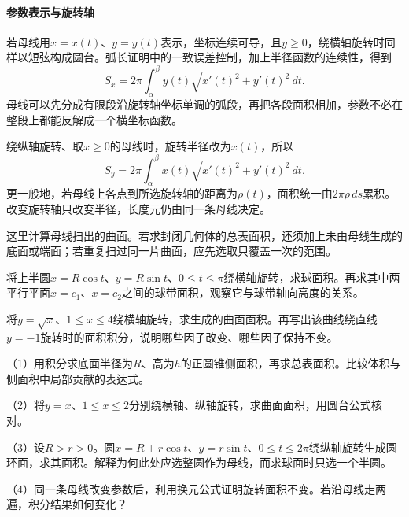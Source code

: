 \paragraph{参数表示与旋转轴} \mbox{}

若母线用\(x=x(t)\)、\(y=y(t)\)表示，坐标连续可导，且\(y\ge0\)，绕横轴旋转时同样以短弦构成圆台。弧长证明中的一致误差控制，加上半径函数的连续性，得到
\begin{equation}\label{eq:calculus-parametric-surface}
 S_x=2\pi\int_\alpha^\beta y(t)\sqrt{x'(t)^2+y'(t)^2}\,dt.
\end{equation}
母线可以先分成有限段沿旋转轴坐标单调的弧段，再把各段面积相加，参数不必在整段上都能反解成一个横坐标函数。

绕纵轴旋转、取\(x\ge0\)的母线时，旋转半径改为\(x(t)\)，所以
\begin{equation*}
 S_y=2\pi\int_\alpha^\beta x(t)\sqrt{x'(t)^2+y'(t)^2}\,dt.
\end{equation*}
更一般地，若母线上各点到所选旋转轴的距离为\(\rho(t)\)，面积统一由\(2\pi\rho\,ds\)累积。改变旋转轴只改变半径，长度元仍由同一条母线决定。

这里计算母线扫出的曲面。若求封闭几何体的总表面积，还须加上未由母线生成的底面或端面；若重复扫过同一片曲面，应先选取只覆盖一次的范围。

\begin{example}
将上半圆\(x=R\cos t\)、\(y=R\sin t\)、\(0\le t\le\pi\)绕横轴旋转，求球面积。再求其中两平行平面\(x=c_1\)、\(x=c_2\)之间的球带面积，观察它与球带轴向高度的关系。
\end{example}

\begin{example}
将\(y=\sqrt{x}\)、\(1\le x\le4\)绕横轴旋转，求生成的曲面面积。再写出该曲线绕直线\(y=-1\)旋转时的面积积分，说明哪些因子改变、哪些因子保持不变。
\end{example}

\begin{exercise}
\mbox{}\par\nobreak

（1）用积分求底面半径为\(R\)、高为\(h\)的正圆锥侧面积，再求总表面积。比较体积与侧面积中局部贡献的表达式。

（2）将\(y=x\)、\(1\le x\le2\)分别绕横轴、纵轴旋转，求曲面面积，用圆台公式核对。

（3）设\(R>r>0\)。圆\(x=R+r\cos t\)、\(y=r\sin t\)、\(0\le t\le2\pi\)绕纵轴旋转生成圆环面，求其面积。解释为何此处应选整圆作为母线，而求球面时只选一个半圆。

（4）同一条母线改变参数后，利用换元公式证明旋转面积不变。若沿母线走两遍，积分结果如何变化？
\end{exercise}
